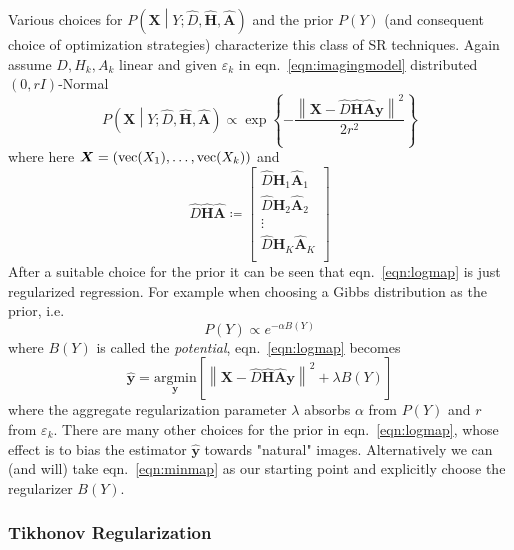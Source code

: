 %
Various choices for $P\left(\bm{X} \middle| Y; \hat{D},  \hat{\bm{H}}, \hat{\bm{A}} \right)$ and the prior $P(Y)$ (and consequent choice of optimization strategies) characterize this class of SR techniques.
%
Again assume $D, H_k, A_k$ linear and given $\varepsilon_k$ in eqn.~\eqref{eqn:imagingmodel} distributed $(0, rI)$-Normal
\begin{equation}
	P\left(\bm{X} \middle| Y; \hat{D},  \hat{\bm{H}}, \hat{\bm{A}} \right) \propto \exp \left\{ -\frac{\left\| \bm{X} - \hat{D} \hat{\bm{H}} \hat{\bm{A}} \bm{y} \right\|^2}{2r^2} \right\}
\end{equation}
where here $\bm{X} = \left( \text{vec}(X_1), \mathellipsis, \text{vec}(X_k) \right)$ and
\begin{equation}
	\hat{D} \hat{\bm{H}} \hat{\bm{A}} \coloneqq \begin{bmatrix}
		\hat{D} \hat{\bm{H}}_1 \hat{\bm{A}}_1 \\
		\hat{D} \hat{\bm{H}}_2 \hat{\bm{A}}_2 \\
		\vdots                                \\
		\hat{D} \hat{\bm{H}}_K \hat{\bm{A}}_K \\
	\end{bmatrix}
\end{equation}
%
After a suitable choice for the prior it can be seen that eqn.~\eqref{eqn:logmap} is just regularized regression.
%
For example when choosing a Gibbs\cite{Hardie1997} distribution as the prior, i.e.
\begin{equation}
	P(Y) \propto e^{-\alpha B(Y)}
	\label{eqn:gibbs}
\end{equation}
where $B(Y)$ is called the \textit{potential}, eqn.~\eqref{eqn:logmap} becomes
\begin{equation}
	\hat{\bm{y}} = \underset{\bm{y}}{\text{argmin}}\left[ \left\| \bm{X} - \hat{D} \hat{\bm{H}} \hat{\bm{A}} \bm{y} \right\|^2 +\lambda B(Y)\right]
	\label{eqn:minmap}
\end{equation}
where the aggregate regularization parameter $\lambda$ absorbs $\alpha$ from $P(Y)$ and $r$ from $\varepsilon_k$.
%
There are many other choices for the prior in eqn.~\eqref{eqn:logmap}, whose effect is to bias the estimator $\hat{\bm{y}}$ towards "natural" images.
%
Alternatively we can (and will) take eqn.~\eqref{eqn:minmap} as our starting point and explicitly choose the regularizer $B(Y)$.

\subsubsection{Tikhonov Regularization}

